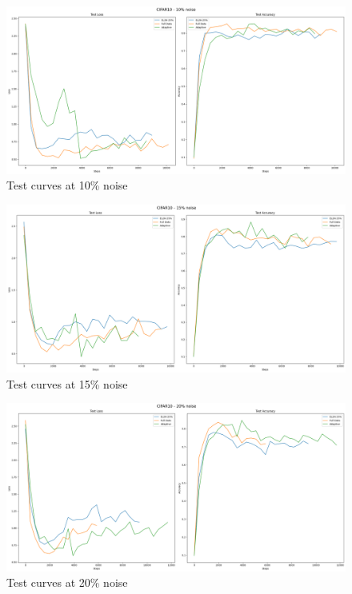 \documentclass{article}
\begin{document}
\begin{figure}[h]
    \centering
    \includegraphics[width=1\textwidth]{output_noise_10.png}
    \caption{Test curves at 10\% noise}
    \label{fig:output_10}
\end{figure}

\begin{figure}[h]
    \centering
    \includegraphics[width=1\textwidth]{output_noise_15.png}
    \caption{Test curves at 15\% noise}
    \label{fig:output_15}
\end{figure}

\begin{figure}[h]
    \centering
    \includegraphics[width=1\textwidth]{output_noise_20.png}
    \caption{Test curves at 20\% noise}
    \label{fig:output_20}
\end{figure}
\end{document}
